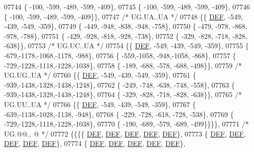 \begin{DoxyCode}
07744 \{ -100, -599, -489, -599, -409\},
07745 \{ -100, -599, -489, -599, -409\},
07746 \{ -100, -599, -489, -599, -409\}\},
07747 \textcolor{comment}{/* UG.UA..UA */}
07748 \{\{  \mbox{\hyperlink{1_88_84__epars_8h_a397419fc12b37ed479c8abb9d444d843}{DEF}}, -549, -439, -549, -359\},
07749 \{ -449, -948, -838, -948, -758\},
07750 \{ -479, -978, -868, -978, -788\},
07751 \{ -429, -928, -818, -928, -738\},
07752 \{ -329, -828, -718, -828, -638\}\},
07753 \textcolor{comment}{/* UG.UC..UA */}
07754 \{\{  \mbox{\hyperlink{1_88_84__epars_8h_a397419fc12b37ed479c8abb9d444d843}{DEF}}, -549, -439, -549, -359\},
07755 \{ -679,-1178,-1068,-1178, -988\},
07756 \{ -559,-1058, -948,-1058, -868\},
07757 \{ -729,-1228,-1118,-1228,-1038\},
07758 \{ -189, -688, -578, -688, -498\}\},
07759 \textcolor{comment}{/* UG.UG..UA */}
07760 \{\{  \mbox{\hyperlink{1_88_84__epars_8h_a397419fc12b37ed479c8abb9d444d843}{DEF}}, -549, -439, -549, -359\},
07761 \{ -939,-1438,-1328,-1438,-1248\},
07762 \{ -249, -748, -638, -748, -558\},
07763 \{ -939,-1438,-1328,-1438,-1248\},
07764 \{ -329, -828, -718, -828, -638\}\},
07765 \textcolor{comment}{/* UG.UU..UA */}
07766 \{\{  \mbox{\hyperlink{1_88_84__epars_8h_a397419fc12b37ed479c8abb9d444d843}{DEF}}, -549, -439, -549, -359\},
07767 \{ -639,-1138,-1028,-1138, -948\},
07768 \{ -229, -728, -618, -728, -538\},
07769 \{ -729,-1228,-1118,-1228,-1038\},
07770 \{ -190, -689, -579, -689, -499\}\}\}\},
07771 \textcolor{comment}{/* UG.@@.. @ */}
07772 \{\{\{\{  \mbox{\hyperlink{1_88_84__epars_8h_a397419fc12b37ed479c8abb9d444d843}{DEF}},  \mbox{\hyperlink{1_88_84__epars_8h_a397419fc12b37ed479c8abb9d444d843}{DEF}},  \mbox{\hyperlink{1_88_84__epars_8h_a397419fc12b37ed479c8abb9d444d843}{DEF}},  \mbox{\hyperlink{1_88_84__epars_8h_a397419fc12b37ed479c8abb9d444d843}{DEF}},  \mbox{\hyperlink{1_88_84__epars_8h_a397419fc12b37ed479c8abb9d444d843}{DEF}}\},
07773 \{  \mbox{\hyperlink{1_88_84__epars_8h_a397419fc12b37ed479c8abb9d444d843}{DEF}},  \mbox{\hyperlink{1_88_84__epars_8h_a397419fc12b37ed479c8abb9d444d843}{DEF}},  \mbox{\hyperlink{1_88_84__epars_8h_a397419fc12b37ed479c8abb9d444d843}{DEF}},  \mbox{\hyperlink{1_88_84__epars_8h_a397419fc12b37ed479c8abb9d444d843}{DEF}},  \mbox{\hyperlink{1_88_84__epars_8h_a397419fc12b37ed479c8abb9d444d843}{DEF}}\},
07774 \{  \mbox{\hyperlink{1_88_84__epars_8h_a397419fc12b37ed479c8abb9d444d843}{DEF}},  \mbox{\hyperlink{1_88_84__epars_8h_a397419fc12b37ed479c8abb9d444d843}{DEF}},  \mbox{\hyperlink{1_88_84__epars_8h_a397419fc12b37ed479c8abb9d444d843}{DEF}},  \mbox{\hyperlink{1_88_84__epars_8h_a397419fc12b37ed479c8abb9d444d843}{DEF}},  \mbox{\hyperlink{1_88_84__epars_8h_a397419fc12b37ed479c8abb9d444d843}{DEF}}\},

\end{DoxyCode}
